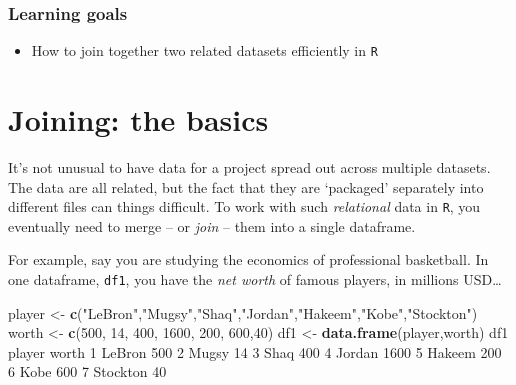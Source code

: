 \documentclass[
]{book}
\newenvironment{Shaded}{\begin{snugshade}}{\end{snugshade}}
\newcommand{\DecValTok}[1]{\textcolor[rgb]{0.00,0.00,0.81}{#1}}
\newcommand{\KeywordTok}[1]{\textcolor[rgb]{0.13,0.29,0.53}{\textbf{#1}}}
\newcommand{\NormalTok}[1]{#1}
\newcommand{\StringTok}[1]{\textcolor[rgb]{0.31,0.60,0.02}{#1}}
\providecommand{\tightlist}{%
  \setlength{\itemsep}{0pt}\setlength{\parskip}{0pt}}
\begin{document}
\hypertarget{learning-goals-14}{%
\subsubsection*{Learning goals}\label{learning-goals-14}}

\begin{itemize}
\tightlist
\item
  How to join together two related datasets efficiently in \texttt{R}
\end{itemize}

\hypertarget{joining-the-basics}{%
\section*{Joining: the basics}\label{joining-the-basics}}

It's not unusual to have data for a project spread out across multiple datasets. The data are all related, but the fact that they are `packaged' separately into different files can things difficult. To work with such \emph{relational} data in \texttt{R}, you eventually need to merge -- or \emph{join} -- them into a single dataframe.

For example, say you are studying the economics of professional basketball. In one dataframe, \texttt{df1}, you have the \emph{net worth} of famous players, in millions USD\ldots{}

\begin{Shaded}
\begin{Highlighting}[]
\NormalTok{player <-}\StringTok{ }\KeywordTok{c}\NormalTok{(}\StringTok{"LeBron"}\NormalTok{,}\StringTok{"Mugsy"}\NormalTok{,}\StringTok{"Shaq"}\NormalTok{,}\StringTok{"Jordan"}\NormalTok{,}\StringTok{"Hakeem"}\NormalTok{,}\StringTok{"Kobe"}\NormalTok{,}\StringTok{"Stockton"}\NormalTok{)}
\NormalTok{worth <-}\StringTok{ }\KeywordTok{c}\NormalTok{(}\DecValTok{500}\NormalTok{, }\DecValTok{14}\NormalTok{, }\DecValTok{400}\NormalTok{, }\DecValTok{1600}\NormalTok{, }\DecValTok{200}\NormalTok{, }\DecValTok{600}\NormalTok{,}\DecValTok{40}\NormalTok{)}
\NormalTok{df1 <-}\StringTok{ }\KeywordTok{data.frame}\NormalTok{(player,worth)}
\NormalTok{df1}
\NormalTok{    player worth}
\DecValTok{1}\NormalTok{   LeBron   }\DecValTok{500}
\DecValTok{2}\NormalTok{    Mugsy    }\DecValTok{14}
\DecValTok{3}\NormalTok{     Shaq   }\DecValTok{400}
\DecValTok{4}\NormalTok{   Jordan  }\DecValTok{1600}
\DecValTok{5}\NormalTok{   Hakeem   }\DecValTok{200}
\DecValTok{6}\NormalTok{     Kobe   }\DecValTok{600}
\DecValTok{7}\NormalTok{ Stockton    }\DecValTok{40}
\end{Highlighting}
\end{Shaded}
\end{document}
